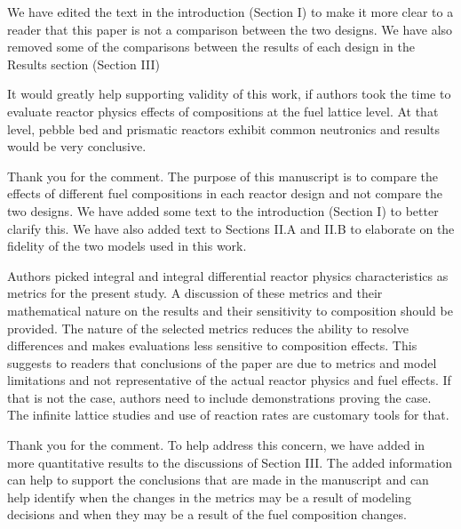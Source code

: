 \documentclass[answers,11pt]{exam}
\begin{document}
\begin{questions}
\begin{solution}
                We have edited the text in the introduction 
                (Section I)
                to make it more clear to a reader that this 
                paper is not a comparison between the two  
                designs. We have also removed some of the 
                comparisons between the results of each 
                design in the Results section (Section III)
        
        
        \end{solution} 
         
        \question It would greatly help supporting validity of this work, if authors
        took the time to evaluate reactor physics effects of compositions at the fuel
        lattice level. At that level, pebble bed and prismatic reactors exhibit common
        neutronics and results would be very conclusive. 
        \begin{solution}
                Thank you for the comment. The purpose of 
                this manuscript is to compare the effects of 
                different fuel compositions in each reactor 
                design and not compare the two designs. We 
                have added some text to the introduction 
                (Section I) to better clarify this. We have 
                also added text to Sections II.A and II.B 
                to elaborate on the fidelity of the two 
                models used in this work. 
        \end{solution} 

        \question Authors picked integral and integral differential reactor physics
        characteristics as metrics for the present study. A discussion of these metrics
        and their mathematical nature on the results and their sensitivity to
        composition should be provided. The nature of the selected metrics reduces the
        ability to resolve differences and makes evaluations less sensitive to
        composition effects. This suggests to readers that conclusions of the paper are
        due to metrics and model limitations and not representative of the actual
        reactor physics and fuel effects. If that is not the case, authors need to
        include demonstrations proving the case. The infinite lattice studies and use
        of reaction rates are customary tools for that. 
        \begin{solution}
                Thank you for the comment. To help address
                this concern, we have added in more 
                quantitative results to the discussions of 
                Section III. The added information can help 
                to support the conclusions that are made 
                in the manuscript and can help identify when 
                the changes in the metrics may be a result 
                of modeling decisions and when they may be 
                a result of the fuel composition changes. 
        \end{solution} 
         

\end{questions}
\end{document}
